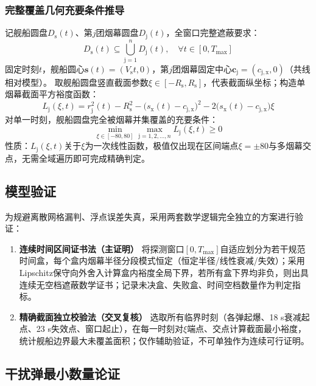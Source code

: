 \documentclass[withoutpreface,bwprint]{cumcmthesis}
\renewcommand{\textbf}[1]{{\song\bfseries #1}}
\begin{document}
\subsubsection{完整覆盖几何充要条件推导}
记舰船圆盘$D_{\mathrm{s}}(t)$、第$j$团烟幕圆盘$D_{\mathrm{j}}(t)$，全窗口完整遮蔽要求：
\begin{equation}
	D_{\mathrm{s}}(t) \subseteq \bigcup_{\mathrm{j}=1}^n D_{\mathrm{j}}(t), \quad \forall t\in [0,T_{\max}]
	\label{eq:union_cover}
\end{equation}
固定时刻$t$，舰船圆心$\bm{s}(t)=(V_{\mathrm{s}} t,0)$，第$j$团烟幕固定中心$\bm{c}_{\mathrm{j}}=(c_{\mathrm{j},\mathrm{x}},0)$（共线相对模型）。
取舰船圆盘竖直截面参数$\xi\in[-R_{\mathrm{s}},R_{\mathrm{s}}]$，代表截面纵坐标；构造单烟幕截面平方裕度函数：
\begin{equation}
	L_{\mathrm{j}}(\xi,t) = r_{\mathrm{j}}^2(t) - R_{\mathrm{s}}^2 - \big(s_{\mathrm{x}}(t)-c_{\mathrm{j},\mathrm{x}}\big)^2 - 2\big(s_{\mathrm{x}}(t)-c_{\mathrm{j},\mathrm{x}}\big)\xi
	\label{eq:L_j}
\end{equation}
对单一时刻，舰船圆盘完全被烟幕并集覆盖的充要条件：
\begin{equation}
	\min_{\xi\in[-80,80]} \max_{\mathrm{j}=1,2,\dots,n} L_{\mathrm{j}}(\xi,t) \ge 0
	\label{eq:full_cover_criterion}
\end{equation}
性质：$L_{\mathrm{j}}(\xi,t)$关于$\xi$为一次线性函数，极值仅出现在区间端点$\xi=\pm80$与多烟幕交点，无需全域遍历即可完成精确判定。

\subsection{模型验证}
为规避离散网格漏判、浮点误差失真，采用两套数学逻辑完全独立的方案进行验证：
\begin{enumerate}
	\item \textbf{连续时间区间证书法（主证明）}
	将探测窗口$[0,T_{\max}]$自适应划分为若干规范时间盒，每个盒内烟幕半径分段模式恒定（恒定半径/线性衰减/失效）；采用Lipschitz保守向外舍入计算盒内裕度全局下界，若所有盒下界均非负，则出具连续无空档遮蔽数学证书；记录未决盒、失败盒、时间空档数量作为判定指标。
	\item \textbf{精确截面独立校验法（交叉复核）}
	选取所有临界时刻（各弹起爆、18 s衰减起点、23 s失效点、窗口起止），在每一时刻对$\xi$端点、交点计算截面最小裕度，统计舰船边界最大未覆盖面积；仅作辅助验证，不可单独作为连续可行证明。
\end{enumerate}

\subsection{干扰弹最小数量论证}
\end{document}
